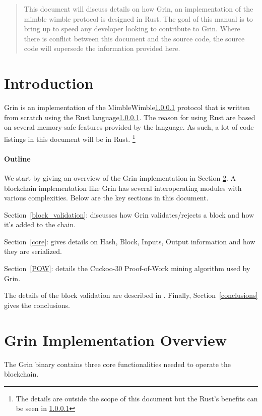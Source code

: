 \documentclass[12pt]{article}
\begin{document}
\maketitle

\begin{abstract}
This document will discuss details on how Grin, an implementation of the mimble wimble protocol is designed in Rust.  The goal of this manual is to bring up to speed any developer looking to contribute to Grin. Where there is conflict between this document and the source code, the source code will supersede the information provided here.
\end{abstract}

\section{Introduction}
Grin is an implementation of the MimbleWimble\ref{} protocol that is written from scratch using the Rust language\ref{}. The reason for using Rust are based on several memory-safe features provided by the language. As such, a lot of code listings in this document will be in Rust. \footnote{The details are outside the scope of this document but the Rust's benefits can be seen in \ref{}}

\paragraph{Outline}

We start by giving an overview of the Grin implementation in Section \ref{sec:Overview}. A blockchain implementation like Grin has several interoperating modules with various complexities. Below are the key sections in this document.


\begin{description}
	\item Section~\ref{block_validation}: discusses how Grin validates/rejects a block and how it's added to the chain.
	\item Section~\ref{core}: gives details on Hash, Block, Inputs, Output information and how they are serialized.
	\item Section~\ref{POW}: details the Cuckoo-30 Proof-of-Work mining algorithm used by Grin.
\end{description}


The details of the block validation are described in .
Finally, Section~\ref{conclusions} gives the conclusions.

\section{Grin Implementation Overview}
\label{sec:Overview}
The Grin binary contains three core functionalities needed to operate the blockchain.
\end{document}
